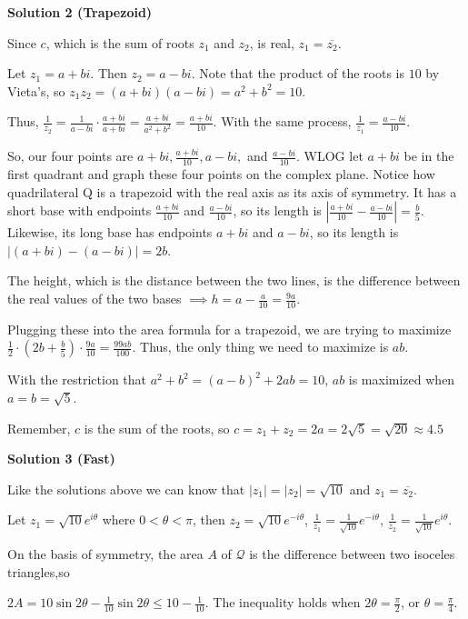 \begin{enumerate}
 



\textbf{Solution 2 (Trapezoid)}

Since $c$, which is the sum of roots $z_1$ and $z_2$, is real, $z_1=\overline{z_2}$. 

 Let $z_1=a+bi$. Then $z_2=a-bi$. Note that the product of the roots is $10$ by Vieta's, so $z_1z_2=(a+bi)(a-bi)=a^2+b^2=10$.

 Thus, $\frac{1}{z_2}=\frac{1}{a-bi}\cdot\frac{a+bi}{a+bi}=\frac{a+bi}{a^2+b^2}=\frac{a+bi}{10}$. With the same process, $\frac{1}{z_1}=\frac{a-bi}{10}$.

 So, our four points are $a+bi,\frac{a+bi}{10},a-bi,$ and $\frac{a-bi}{10}$. WLOG let $a+bi$ be in the first quadrant and graph these four points on the complex plane. Notice how quadrilateral Q is a trapezoid with the real axis as its axis of symmetry. It has a short base with endpoints $\frac{a+bi}{10}$ and $\frac{a-bi}{10}$, so its length is $\left|\frac{a+bi}{10} - \frac{a-bi}{10}\right| =\frac{b}{5}$. Likewise, its long base has endpoints $a+bi$ and $a-bi$, so its length is $|(a+bi)-(a-bi)|=2b$. 

 The height, which is the distance between the two lines, is the difference between the real values of the two bases $\implies h= a-\frac{a}{10}=\frac{9a}{10}$.

 Plugging these into the area formula for a trapezoid, we are trying to maximize $\frac12\cdot\left(2b+\frac{b}{5}\right)\cdot\frac{9a}{10}=\frac{99ab}{100}$. Thus, the only thing we need to maximize is $ab$.

 With the restriction that $a^2+b^2=(a-b)^2+2ab=10$, $ab$ is maximized when $a=b=\sqrt{5}$. 

 Remember, $c$ is the sum of the roots, so $c=z_1+z_2=2a=2\sqrt5=\sqrt{20}\approx\boxed{4.5}$




\textbf{Solution 3 (Fast)}

Like the solutions above we can know that $|z_1| = |z_2| = \sqrt{10}$ and $z_1=\overline{z_2}$.

 Let $z_1=\sqrt{10}e^{i\theta}$ where $0<\theta<\pi$, then $z_2=\sqrt{10}e^{-i\theta}$, $\frac{1}{z_1}=\frac{1}{\sqrt{10}}e^{-i\theta}$, $\frac{1}{z_2}= \frac{1}{\sqrt{10}}e^{i\theta}$.

 On the basis of symmetry, the area $A$ of $\mathcal{Q}$ is the difference between two isoceles triangles,so

 $2A=10\sin2\theta-\frac{1}{10}\sin2\theta\leq10-\frac{1}{10}$. The inequality holds when $2\theta=\frac{\pi}{2}$, or $\theta=\frac{\pi}{4}$.


\end{enumerate}
